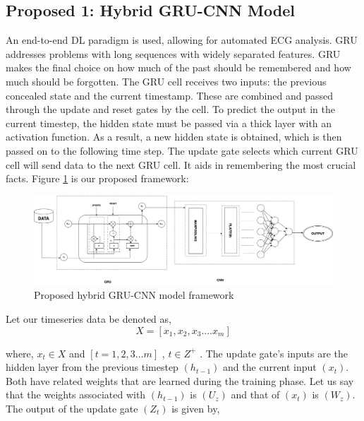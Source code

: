 \documentclass[a4paper, fleqn]{cas-sc}
\begin{document}
 
 \subsection{Proposed 1: Hybrid GRU-CNN Model}
 
 
 An end-to-end DL paradigm is used,  allowing for automated ECG analysis.  GRU addresses problems with long sequences with widely separated features. GRU makes the final choice on how much of the past should be remembered and how much should be forgotten. The GRU cell receives two inputs: the previous concealed state and the current timestamp. These are combined and passed through the update and reset gates by the cell. To predict the output in the current timestep,  the hidden state must be passed via a thick layer with an activation function. As a result,  a new hidden state is obtained,  which is then passed on to the following time step. The update gate selects which current GRU cell will send data to the next GRU cell. It aids in remembering the most crucial facts. Figure \ref{Fig:5} is our proposed framework:



    \begin{figure}
      \centering
      \includegraphics[scale= 0.25]{architecturepro1.png}
      \caption{Proposed hybrid GRU-CNN model framework}
      \label{Fig:5}
    \end{figure}



 Let our timeseries data be denoted as, 
 \begin{equation}
  X = [ x_1,  x_2,  x_3.... x_m]
 \end{equation}

where,   $x_t \in X$ and $[t = 1, 2, 3...m]$ ,  $t \in Z^+$ . The update gate's inputs are the hidden layer from the previous timestep $(h_{t-1})$ and the current input $( x_t )$. Both have related weights that are learned during the training phase. Let us say that the weights associated with $(h_{t-1})$ is $( U_z )$ and that of $( x_t )$ is $( W_z )$. The output of the update gate $( Z_t )$ is given by, 
\end{document}
